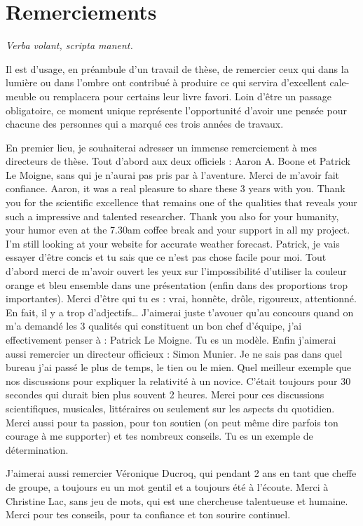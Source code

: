 \chapter{{\selectfont Remerciements}}

\textit{Verba volant, scripta manent.}

Il est d’usage, en préambule d’un travail de thèse, de remercier ceux qui dans la lumière ou dans l’ombre ont contribué à produire ce qui servira d’excellent cale-meuble ou remplacera pour certains leur livre favori. Loin d’être un passage obligatoire, ce moment unique représente l’opportunité d’avoir une pensée pour chacune des personnes qui a marqué ces trois années de travaux.

En premier lieu, je souhaiterai adresser un immense remerciement à mes directeurs de thèse. Tout d’abord aux deux officiels : Aaron A. Boone et Patrick Le Moigne, sans qui je n’aurai pas pris par à l’aventure. Merci de m’avoir fait confiance.
Aaron, it was a real pleasure to share these 3 years with you. Thank you for the scientific excellence that remains one of the qualities that reveals your such a impressive and talented researcher. Thank you also for your humanity, your humor even at the 7.30am coffee break and your support in all my project. I’m still looking at your website for accurate weather forecast.
Patrick, je vais essayer d’être concis et tu sais que ce n’est pas chose facile pour moi. Tout d’abord merci de m’avoir ouvert les yeux sur l’impossibilité d’utiliser la couleur orange et bleu ensemble dans une présentation (enfin dans des proportions trop importantes). Merci d’être qui tu es : vrai, honnête, drôle, rigoureux, attentionné. En fait, il y a trop d’adjectifs… J’aimerai juste t’avouer qu’au concours quand on m’a demandé les 3 qualités qui constituent un bon chef d’équipe, j’ai effectivement penser à : Patrick Le Moigne. Tu es un modèle.
Enfin j’aimerai aussi remercier un directeur officieux : Simon Munier. Je ne sais pas dans quel bureau j’ai passé le plus de temps, le tien ou le mien. Quel meilleur exemple que nos discussions pour expliquer la relativité à un novice. C’était toujours pour 30 secondes qui durait bien plus souvent 2 heures. Merci pour ces discussions scientifiques, musicales, littéraires ou seulement sur les aspects du quotidien. Merci aussi pour ta passion, pour ton soutien (on peut même dire parfois ton courage à me supporter) et tes nombreux conseils. Tu es un exemple de détermination.

J’aimerai aussi remercier Véronique Ducroq, qui pendant 2 ans en tant que cheffe de groupe, a toujours eu un mot gentil et a toujours été à l’écoute.
Merci à Christine Lac, sans jeu de mots, qui est une chercheuse talentueuse et humaine. Merci pour tes conseils, pour ta confiance et ton sourire continuel.

